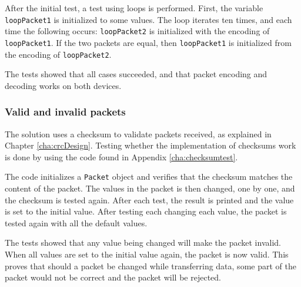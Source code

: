 After the initial test, a test using loops is performed. First, the variable  \texttt{loopPacket1} is initialized to some values. The loop iterates ten times, and each time the following occurs: \texttt{loopPacket2} is initialized with the encoding of \texttt{loopPacket1}. If the two packets are equal, then \texttt{loopPacket1} is initialized from the encoding of \texttt{loopPacket2}. 

The tests showed that all cases succeeded, and that packet encoding and decoding works on both devices.

\subsubsection*{Valid and invalid packets}
The solution uses a checksum to validate packets received, as explained in Chapter \ref{cha:crcDesign}. Testing whether the implementation of checksums work is done by using the code found in Appendix \ref{cha:checksumtest}.

The code initializes a \texttt{Packet} object and verifies that the checksum matches the content of the packet. The values in the packet is then changed, one by one, and the checksum is tested again. After each test, the result is printed and the value is set to the initial value. After testing each changing each value, the packet is tested again with all the default values.

The tests showed that any value being changed will make the packet invalid. When all values are set to the initial value again, the packet is now valid.
This proves that should a packet be changed while transferring data, some part of the packet would not be correct and the packet will be rejected.